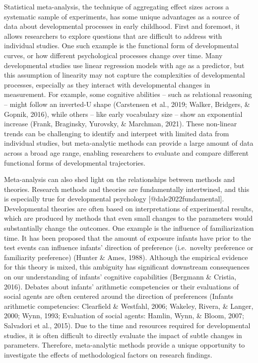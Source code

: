 \documentclass[10pt, letterpaper]{article}
\begin{document}
Statistical meta-analysis, the technique of aggregating effect sizes
across a systematic sample of experiments, has some unique advantages as
a source of data about developmental processes in early childhood. First
and foremost, it allows researchers to explore questions that are
difficult to address with individual studies. One such example is the
functional form of developmental curves, or how different psychological
processes change over time. Many developmental studies use linear
regression models with age as a predictor, but this assumption of
linearity may not capture the complexities of developmental processes,
especially as they interact with developmental changes in measurement.
For example, some cognitive abilities -- such as relational reasoning --
might follow an inverted-U shape (Carstensen et al., 2019; Walker,
Bridgers, \& Gopnik, 2016), while others -- like early vocabulary size
-- show an exponential increase (Frank, Braginsky, Yurovsky, \&
Marchman, 2021). These non-linear trends can be challenging to identify
and interpret with limited data from individual studies, but
meta-analytic methods can provide a large amount of data across a broad
age range, enabling researchers to evaluate and compare different
functional forms of developmental trajectories.

Meta-analysis can also shed light on the relationships between methods
and theories. Research methods and theories are fundamentally
intertwined, and this is especially true for developmental psychology
{[}@\hspace{0pt}\hspace{0pt}dale2022fundamental{]}. Developmental
theories are often based on interpretations of experimental results,
which are produced by methods that even small changes to the parameters
would substantially change the outcomes. One example is the influence of
familiarization time. It has been proposed that the amount of exposure
infants have prior to the test events can influence infants' direction
of preference (i.e.~novelty preference or familiarity preference)
(Hunter \& Ames, 1988). Although the empirical evidence for this theory
is mixed, this ambiguity has significant downstream consequences on our
understanding of infants' cognitive capabilities (Bergmann \& Cristia,
2016). Debates about infants' arithmetic competencies or their
evaluations of social agents are often centered around the direction of
preferences (Infants arithmetic competencies: Clearfield \& Westfahl,
2006; Wakeley, Rivera, \& Langer, 2000; Wynn, 1993; Evaluation of social
agents: Hamlin, Wynn, \& Bloom, 2007; Salvadori et al., 2015). Due to
the time and resources required for developmental studies, it is often
difficult to directly evaluate the impact of subtle changes in
parameters. Therefore, meta-analytic methods provide a unique
opportunity to investigate the effects of methodological factors on
research findings.
\end{document}
